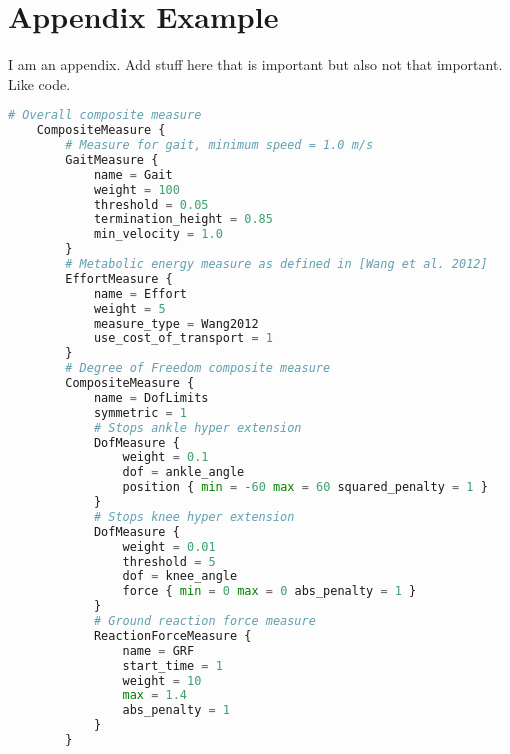 
\chapter{Appendix Example} \label{App:Appendix1}


I am an appendix. Add stuff here that is important but also not that important. Like code.

\begin{lstlisting}[language=Python, caption= Original measures included for gait control optimisation in SCONE base model, label= Code:OriginalMeasures]
	# Overall composite measure
	CompositeMeasure {
		# Measure for gait, minimum speed = 1.0 m/s
		GaitMeasure {
			name = Gait
			weight = 100
			threshold = 0.05
			termination_height = 0.85
			min_velocity = 1.0
		}
		# Metabolic energy measure as defined in [Wang et al. 2012]
		EffortMeasure {
			name = Effort
			weight = 5
			measure_type = Wang2012
			use_cost_of_transport = 1
		}
		# Degree of Freedom composite measure
		CompositeMeasure {
			name = DofLimits
			symmetric = 1
			# Stops ankle hyper extension
			DofMeasure {    
				weight = 0.1
				dof = ankle_angle
				position { min = -60 max = 60 squared_penalty = 1 }
			}
			# Stops knee hyper extension
			DofMeasure { 		
				weight = 0.01
				threshold = 5
				dof = knee_angle
				force { min = 0 max = 0 abs_penalty = 1 }
			}	
			# Ground reaction force measure
			ReactionForceMeasure {
				name = GRF
				start_time = 1
				weight = 10
				max = 1.4
				abs_penalty = 1
			}	
		}	
	\end{lstlisting}